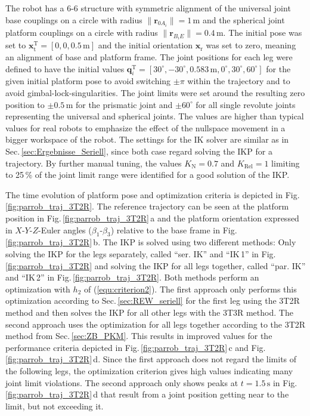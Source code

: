 \documentclass[robotics,article,submit,moreauthors,pdftex]{Definitions/mdpi}
\newcommand{\bm}[1]{\boldsymbol{#1}}
\newcommand{\transp}[0]{{\mathrm{T}}}
\begin{document}
The robot has a 6-6 structure with symmetric alignment of the universal joint base couplings on a circle with radius $\lVert\bm{r}_{0A_i}\rVert=1\,\mathrm{m}$ and the spherical joint platform couplings on a circle with radius $\lVert\bm{r}_{B_iE}\rVert=0.4\,\mathrm{m}$.
The initial pose was set to $\bm{x}_\mathrm{t}^\transp=[0,0,0.5\,\mathrm{m}]$ and the initial orientation $\bm{x}_\mathrm{r}$ was set to zero, meaning an alignment of base and platform frame.
The joint positions for each leg were defined to have the initial values $\bm{q}_i^\transp=[30^\circ,-30^\circ,0.583\,\mathrm{m},0^\circ,30^\circ,60^\circ]$ for the given initial platform pose to avoid switching $\pm\pi$ within the trajectory and to avoid gimbal-lock-singularities.
The joint limits were set around the resulting zero position to $\pm0.5\,\mathrm{m}$ for the prismatic joint and $\pm60^\circ$ for all single revolute joints representing the universal and spherical joints.
The values are higher than typical values for real robots to emphasize the effect of the nullspace movement in a bigger workspace of the robot.
The settings for the IK solver are similar as in Sec.\,\ref{sec:Ergebnisse_Seriell}, since both case regard solving the IKP for a trajectory.
By further manual tuning, the values $K_\mathrm{N}=0.7$ and $K_\mathrm{Rel}=1$ limiting to 25\,\% of the joint limit range were identified for a good solution of the IKP.

The time evolution of platform pose and optimization criteria is depicted in Fig.\,\ref{fig:parrob_traj_3T2R}.
The reference trajectory can be seen at the platform position in Fig.\,\ref{fig:parrob_traj_3T2R}\,a and the platform orientation expressed in $X$-$Y$-$Z$-Euler angles ($\beta_1$-$\beta_3$) relative to the base frame in Fig.\,\ref{fig:parrob_traj_3T2R}\,b.
The IKP is solved using two different methods: Only solving the IKP for the legs separately, called ``ser. IK'' and ``IK\,1'' in Fig.\,\ref{fig:parrob_traj_3T2R} and solving the IKP for all legs together, called ``par. IK'' and ``IK\,2'' in Fig.\,\ref{fig:parrob_traj_3T2R}.
Both methods perform an optimization with $h_2$ of (\ref{equ:criterion2}).
The first approach only performs this optimization according to Sec.\,\ref{sec:REW_seriell} for the first leg using the 3T2R method and then solves the IKP for all other legs with the 3T3R method.
The second approach uses the optimization for all legs together according to the 3T2R method from Sec.\,\ref{sec:ZB_PKM}.
This results in improved values for the performance criteria depicted in Fig.\,\ref{fig:parrob_traj_3T2R}\,c and Fig.\,\ref{fig:parrob_traj_3T2R}\,d.
Since the first approach does not regard the limits of the following legs, the optimization criterion gives high values indicating many joint limit violations.
The second approach only shows peaks at $t=1.5\,\mathrm{s}$ in Fig.\,\ref{fig:parrob_traj_3T2R}\,d that result from a joint position getting near to the limit, but not exceeding it.
\end{document}
